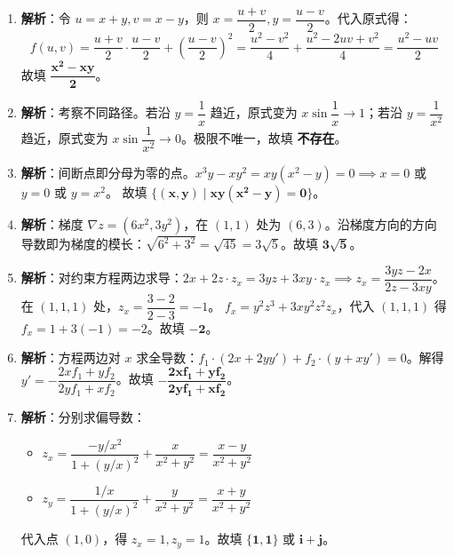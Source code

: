 \documentclass[lang=cn,11pt]{elegantbook}
\begin{document}
\begin{solution}
\begin{enumerate}
  \item \textbf{解析}：令 $u=x+y, v=x-y$，则 $x=\dfrac{u+v}{2}, y=\dfrac{u-v}{2}$。代入原式得：
  \[
  f(u,v) = \frac{u+v}{2} \cdot \frac{u-v}{2} + \left(\frac{u-v}{2}\right)^2 = \frac{u^2-v^2}{4} + \frac{u^2-2uv+v^2}{4} = \frac{u^2-uv}{2}
  \]
  故填 $\mathbf{\dfrac{x^2-xy}{2}}$。
  
  \item \textbf{解析}：考察不同路径。若沿 $y = \dfrac{1}{x}$ 趋近，原式变为 $x\sin\dfrac{1}{x} \to 1$；若沿 $y = \dfrac{1}{x^2}$ 趋近，原式变为 $x\sin\dfrac{1}{x^2} \to 0$。极限不唯一，故填 \textbf{不存在}。
  
  \item \textbf{解析}：间断点即分母为零的点。$x^3y-xy^2 = xy(x^2-y) = 0 \implies x=0$ 或 $y=0$ 或 $y=x^2$。
  故填 $\mathbf{\{(x,y) \mid xy(x^2-y)=0\}}$。
  
  \item \textbf{解析}：梯度 $\nabla z = (6x^2, 3y^2)$，在 $(1,1)$ 处为 $(6,3)$。沿梯度方向的方向导数即为梯度的模长：$\sqrt{6^2+3^2} = \sqrt{45} = 3\sqrt{5}$。故填 $\mathbf{3\sqrt{5}}$。
  
  \item \textbf{解析}：对约束方程两边求导：$2x + 2z \cdot z_x = 3yz + 3xy \cdot z_x \implies z_x = \dfrac{3yz-2x}{2z-3xy}$。
  在 $(1,1,1)$ 处，$z_x = \dfrac{3-2}{2-3} = -1$。
  $f_x = y^2z^3 + 3xy^2z^2 z_x$，代入 $(1,1,1)$ 得 $f_x = 1 + 3(-1) = -2$。故填 $\mathbf{-2}$。
  
  \item \textbf{解析}：方程两边对 $x$ 求全导数：$f_1 \cdot (2x+2y y') + f_2 \cdot (y+x y') = 0$。解得 $y' = -\dfrac{2x f_1 + y f_2}{2y f_1 + x f_2}$。故填 $\mathbf{-\dfrac{2x f_1 + y f_2}{2y f_1 + x f_2}}$。
  
  \item \textbf{解析}：分别求偏导数：
  \begin{itemize}
    \item $z_x = \dfrac{-y/x^2}{1+(y/x)^2} + \dfrac{x}{x^2+y^2} = \dfrac{x-y}{x^2+y^2}$
    \item $z_y = \dfrac{1/x}{1+(y/x)^2} + \dfrac{y}{x^2+y^2} = \dfrac{x+y}{x^2+y^2}$
  \end{itemize}
  代入点 $(1,0)$，得 $z_x = 1, z_y = 1$。故填 $\mathbf{\{1, 1\}}$ 或 $\mathbf{\boldsymbol i + \boldsymbol j}$。
  

\end{enumerate}
\end{solution}
\end{document}
